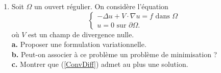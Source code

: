 \documentclass[12pt,a4paper]{article}
\begin{document}
\begin{enumerate}
\item Soit $\Omega$ un ouvert r\'egulier. On consid\`ere l'\'equation 
\begin{equation}\label{ConvDiff}
\begin{cases}
-\Delta u +V\cdot\nabla u = f \text{ dans }\Omega\\
u = 0 \text{ sur }\partial\Omega.
\end{cases}
\end{equation}
o\`u $V$ est un champ de divergence nulle. \\
{\bf a.} Proposer une formulation variationnelle. \\
{\bf b.} Peut-on associer à ce probl\`eme un probl\`eme de
minimisation ? \\
{\bf c.} Montrer que (\ref{ConvDiff}) admet au plus une solution. \\



\end{enumerate}
\end{document}
